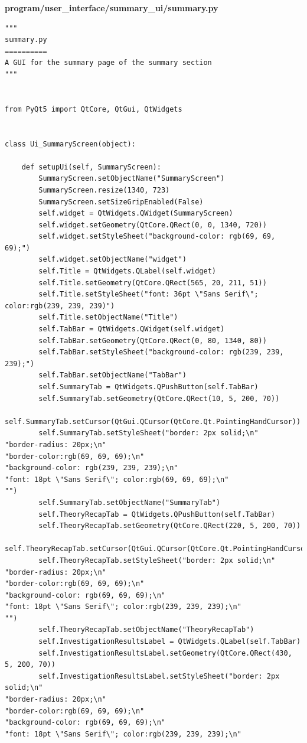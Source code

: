 \documentclass[12pt]{article}
\begin{document}
\textbf{program/user\_interface/summary\_ui/summary.py}
\begin{lstlisting}
"""
summary.py
==========
A GUI for the summary page of the summary section
"""


from PyQt5 import QtCore, QtGui, QtWidgets


class Ui_SummaryScreen(object):

    def setupUi(self, SummaryScreen):
        SummaryScreen.setObjectName("SummaryScreen")
        SummaryScreen.resize(1340, 723)
        SummaryScreen.setSizeGripEnabled(False)
        self.widget = QtWidgets.QWidget(SummaryScreen)
        self.widget.setGeometry(QtCore.QRect(0, 0, 1340, 720))
        self.widget.setStyleSheet("background-color: rgb(69, 69, 69);")
        self.widget.setObjectName("widget")
        self.Title = QtWidgets.QLabel(self.widget)
        self.Title.setGeometry(QtCore.QRect(565, 20, 211, 51))
        self.Title.setStyleSheet("font: 36pt \"Sans Serif\"; color:rgb(239, 239, 239)")
        self.Title.setObjectName("Title")
        self.TabBar = QtWidgets.QWidget(self.widget)
        self.TabBar.setGeometry(QtCore.QRect(0, 80, 1340, 80))
        self.TabBar.setStyleSheet("background-color: rgb(239, 239, 239);")
        self.TabBar.setObjectName("TabBar")
        self.SummaryTab = QtWidgets.QPushButton(self.TabBar)
        self.SummaryTab.setGeometry(QtCore.QRect(10, 5, 200, 70))
        self.SummaryTab.setCursor(QtGui.QCursor(QtCore.Qt.PointingHandCursor))
        self.SummaryTab.setStyleSheet("border: 2px solid;\n"
"border-radius: 20px;\n"
"border-color:rgb(69, 69, 69);\n"
"background-color: rgb(239, 239, 239);\n"
"font: 18pt \"Sans Serif\"; color:rgb(69, 69, 69);\n"
"")
        self.SummaryTab.setObjectName("SummaryTab")
        self.TheoryRecapTab = QtWidgets.QPushButton(self.TabBar)
        self.TheoryRecapTab.setGeometry(QtCore.QRect(220, 5, 200, 70))
        self.TheoryRecapTab.setCursor(QtGui.QCursor(QtCore.Qt.PointingHandCursor))
        self.TheoryRecapTab.setStyleSheet("border: 2px solid;\n"
"border-radius: 20px;\n"
"border-color:rgb(69, 69, 69);\n"
"background-color: rgb(69, 69, 69);\n"
"font: 18pt \"Sans Serif\"; color:rgb(239, 239, 239);\n"
"")
        self.TheoryRecapTab.setObjectName("TheoryRecapTab")
        self.InvestigationResultsLabel = QtWidgets.QLabel(self.TabBar)
        self.InvestigationResultsLabel.setGeometry(QtCore.QRect(430, 5, 200, 70))
        self.InvestigationResultsLabel.setStyleSheet("border: 2px solid;\n"
"border-radius: 20px;\n"
"border-color:rgb(69, 69, 69);\n"
"background-color: rgb(69, 69, 69);\n"
"font: 18pt \"Sans Serif\"; color:rgb(239, 239, 239);\n"

\end{lstlisting}
\end{document}
